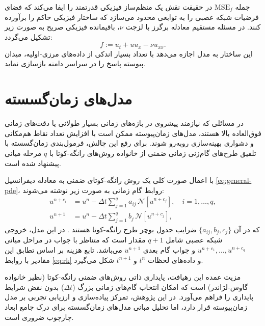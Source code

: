جمله $\mathrm{MSE}_f$ در حقیقت نقش یک منظم‌ساز فیزیکی قدرتمند را ایفا می‌کند که فضای فرضیات شبکه عصبی را به توابعی محدود می‌سازد که ساختار فیزیکی حاکم را برآورده کنند. در مسئله مستقیم معادله برگرز با لزجت $\nu$، باقیمانده فیزیکی صریح به صورت زیر تشکیل می‌گردد:
\begin{equation}
f := u_t + u u_x - \nu u_{xx}.
\label{eq:burgers-f}
\end{equation}
این ساختار به مدل اجازه می‌دهد با تعداد بسیار اندکی از داده‌های مرزی-اولیه، میدان پیوسته پاسخ را در سراسر دامنه بازسازی نماید.

\section{مدل‌های زمان‌گسسته}
\label{sec:discrete}

در مسائلی که نیازمند پیشروی در بازه‌های زمانی بسیار طولانی یا دقت‌های زمانی فوق‌العاده بالا هستند، مدل‌های زمان‌پیوسته ممکن است با افزایش تعداد نقاط هم‌مکانی و دشواری بهینه‌سازی روبه‌رو شوند. برای رفع این چالش، فرمول‌بندی زمان‌گسسته با تلفیق طرح‌های گام‌زنی زمانی ضمنی از خانواده روش‌های رانگه-کوتا با $q$ مرحله میانی پیشنهاد شده است.

با اعمال صورت کلی یک روش رانگه-کوتای ضمنی به معادله دیفرانسیل \eqref{eq:general-pde}، روابط گام زمانی به صورت زیر نوشته می‌شوند:
\begin{equation}
\begin{aligned}
u^{n+c_i} &= u^n - \Delta t \sum_{j=1}^{q} a_{ij}\, \mathcal{N}[u^{n+c_j}], \quad i=1,\dots,q, \\
u^{n+1} &= u^n - \Delta t \sum_{j=1}^{q} b_j\, \mathcal{N}[u^{n+c_j}],
\end{aligned}
\label{eq:rk}
\end{equation}
که در آن $\{a_{ij}, b_j, c_j\}$ ضرایب جدول بوچر طرح رانگه-کوتا هستند \cite{butcher2016}. در این مدل، خروجی شبکه عصبی شامل $q+1$ مقدار است که متناظر با جواب در مراحل میانی $u^{n+c_1},\dots,u^{n+c_q}$ و جواب گام بعدی $u^{n+1}$ می‌باشد. تابع هزینه بر اساس تطابق این مقادیر با روابط \eqref{eq:rk} و داده‌های لحظات $t^n$ و $t^{n+1}$ شکل می‌گیرد.

مزیت عمده این رهیافت، پایداری ذاتی روش‌های ضمنی رانگه-کوتا (نظیر خانواده گاوس-لژاندر) است که امکان انتخاب گام‌های زمانی بزرگ ($\Delta t$) بدون نقض شرایط پایداری را فراهم می‌آورد. در این پژوهش، تمرکز پیاده‌سازی و ارزیابی تجربی بر مدل زمان‌پیوسته قرار دارد، اما تحلیل مبانی مدل‌های زمان‌گسسته برای درک جامع ابعاد چارچوب ضروری است.

